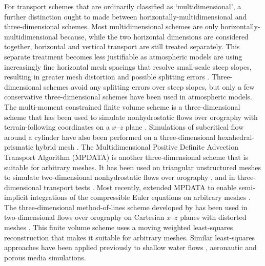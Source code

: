 For transport schemes that are ordinarily classified as `multidimensional', a further distinction ought to made between horizontally-multidimensional and three-dimensional schemes.
Most multidimensional schemes are only horizontally-multidimensional because, while the two horizontal dimensions are considered together, horizontal and vertical transport are still treated separately.
This separate treatment becomes less justifiable as atmospheric models are using increasingly fine horizontal mesh spacings that resolve small-scale steep slopes, resulting in greater mesh distortion and possible splitting errors \citep{kent2014}.
Three-dimensional schemes avoid any splitting errors over steep slopes, but only a few conservative three-dimensional schemes have been used in atmospheric models.
The multi-moment constrained finite volume scheme \citep{ii-xiao2009} is a three-dimensional scheme that has been used to simulate nonhydrostatic flows over orography with terrain-following coordinates on a $x$--$z$ plane \citep{li2013}.  Simulations of subcritical flow around a cylinder have also been performed on a three-dimensional hexahedral-prismatic hybrid mesh \citep{xie-xiao2016}.
The Multidimensional Positive Definite Advection Transport Algorithm (MPDATA) is another three-dimensional scheme that is suitable for arbitrary meshes.
It has been used on triangular unstructured meshes to simulate two-dimensional nonhydrostatic flows over orography \citep{smolarkiewicz-szmelter2011}, and in three-dimensional transport tests \citep{smolarkiewicz-szmelter2005}. 
Most recently, \citet{kuehnlein-smolarkiewicz2017} extended MPDATA to enable semi-implicit integrations of the compressible Euler equations on arbitrary meshes .
The three-dimensional method-of-lines scheme developed by \citet{weller-shahrokhi2014} has been used in two-dimensional flows over orography on Cartesian $x$--$z$ planes with distorted meshes \citep{chen2017}.
This finite volume scheme uses a moving weighted least-squares reconstruction \citep{lashley2002,thuburn2014} that makes it suitable for arbitrary meshes.
Similar least-squares approaches have been applied previously to shallow water flows \citep{cuetofelgueroso2006}, aeronautic \citep{cuetofelgueroso2007} and porous media \citep{white2017} simulations.

